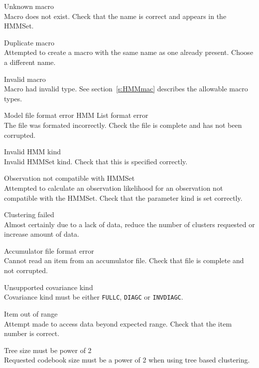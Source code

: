 \begin{itemize}
\begin{itemize}
    Unknown macro\\
        Macro does not exist.  Check that the name is correct and appears 
        in the HMMSet.

    Duplicate macro\\
        Attempted to create a macro with the same name as one already present.
        Choose a different name.

    Invalid macro\\
        Macro had invalid type.  See section~\ref{s:HMMmac} describes the 
        allowable macro types.

    Model file format error
    HMM List format error\\
        The file was formated incorrectly.  Check the file is complete and
        has not been corrupted.

    Invalid HMM kind\\
        Invalid HMMSet kind.  Check that this is specified correctly.

    Observation not compatible with HMMSet\\
        Attempted to calculate an observation likelihood for an observation
        not compatible with the HMMSet.  Check that the parameter kind is
        set correctly.

\end{itemize}


\begin{itemize}
    Clustering failed\\
        Almost certainly due to a lack of data, reduce the
        number of clusters requested  or increase amount of data.

    Accumulator file format error\\
        Cannot read an item from an accumulator file. Check
        that file is complete and not corrupted.

    Unsupported covariance kind\\
        Covariance kind must be either \texttt{FULLC}, \texttt{DIAGC} or 
        \texttt{INVDIAGC}.

    Item out of range\\
        Attempt made to access data beyond expected range. Check that 
        the item number is correct.

    Tree size must be power of 2\\
        Requested codebook size must be a power of 2 when
        using tree based clustering.


\end{itemize}
\end{itemize}
